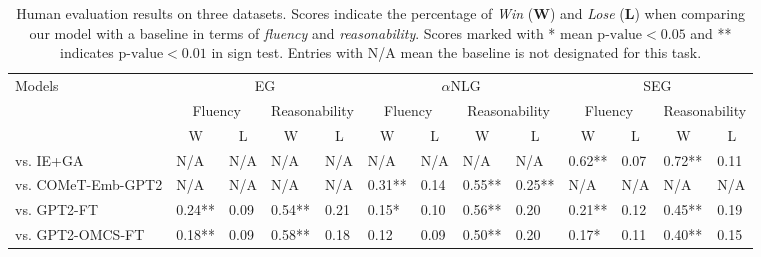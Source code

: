 \documentclass[11pt,a4paper]{article}
\begin{document}
\begin{table}[t]
    \centering
    \scriptsize
    \begin{tabular}{l llll llll llll}
    \toprule[1.5pt]
        \multirow{3}{*}[-5pt]{Models} & \multicolumn{4}{c}{EG} & 
        \multicolumn{4}{c}{$\alpha$NLG} & \multicolumn{4}{c}{SEG} \\
        \cmidrule(lr){2-5} \cmidrule(lr){6-9} \cmidrule(lr){10-13}
        {} & \multicolumn{2}{c}{Fluency} & \multicolumn{2}{c}{Reasonability} & \multicolumn{2}{c}{Fluency} & \multicolumn{2}{c}{Reasonability} & \multicolumn{2}{c}{Fluency} & \multicolumn{2}{c}{Reasonability} \\
        \cmidrule(lr){2-3} \cmidrule(lr){4-5} \cmidrule(lr){6-7} \cmidrule(lr){8-9} \cmidrule(lr){10-11} \cmidrule(lr){12-13}
        {} & \multicolumn{1}{c}{W} & \multicolumn{1}{c}{L} & \multicolumn{1}{c}{W} & \multicolumn{1}{c}{L} & \multicolumn{1}{c}{W} & \multicolumn{1}{c}{L} & \multicolumn{1}{c}{W} & \multicolumn{1}{c}{L} & \multicolumn{1}{c}{W} & \multicolumn{1}{c}{L} & \multicolumn{1}{c}{W} & \multicolumn{1}{c}{L}\\
    \midrule[1pt]
    vs. IE+GA & N/A & N/A & N/A & N/A & N/A & N/A & N/A & N/A & 0.62** & 0.07 & 0.72** & 0.11 \\
    vs. COMeT-Emb-GPT2 & N/A & N/A & N/A & N/A & 0.31** & 0.14 & 0.55** & 0.25** & N/A & N/A & N/A & N/A \\
    vs. GPT2-FT & 0.24** & 0.09 & 0.54** & 0.21 & 0.15* & 0.10 & 0.56** & 0.20 & 0.21** & 0.12 & 0.45** & 0.19\\
    vs. GPT2-OMCS-FT & 0.18** & 0.09 & 0.58** & 0.18 & 0.12 & 0.09 & 0.50** & 0.20 & 0.17* & 0.11 & 0.40** & 0.15\\
    \bottomrule[1.5pt]
    \end{tabular}
    \caption{Human evaluation results on three datasets. Scores indicate the percentage of \textit{Win} (\textbf{W}) and \textit{Lose} (\textbf{L}) when comparing our model with a baseline in terms of \textit{fluency} and \textit{reasonability}. Scores marked with * mean $\text{p-value}<0.05$ and ** indicates $\text{p-value}<0.01$ in sign test. Entries with N/A mean the baseline is not designated for this task.}
    \label{tab:human}
\end{table}
\end{document}
